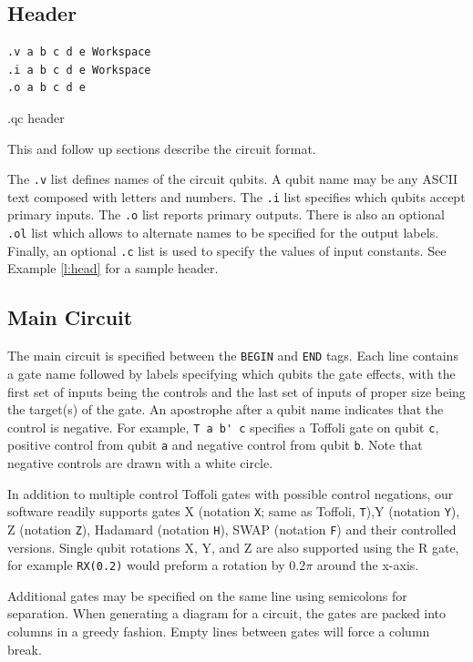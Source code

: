 \documentclass[aps,prl,reprint,floatfix,superscriptaddress]{revtex4-1} %
\begin{document}
\subsection{Header}
\begin{program}
\begin{verbatim}
.v a b c d e Workspace
.i a b c d e Workspace
.o a b c d e
\end{verbatim}
\caption{.qc header}
\label{l:head}
\end{program}
This and follow up sections describe the circuit format. 

The \verb+.v+ list defines names of the circuit qubits. A qubit name may be any ASCII text composed with letters and numbers. The \verb+.i+ list specifies which %
qubits accept primary inputs.
The \verb+.o+ list reports primary outputs.
There is also an optional \verb+.ol+ list which allows to alternate names to be 
specified for the output labels. Finally, an optional \verb+.c+ list is used to
specify the values of input constants. See Example \ref{l:head} for a sample header.

\subsection{Main Circuit}
The main circuit is specified between the \verb+BEGIN+ and \verb+END+ tags.  Each line contains a gate name followed by labels
specifying which qubits the gate effects, with the first set of inputs being the controls
and the last set of inputs of proper size being the target(s) of the gate.
An apostrophe after a qubit name indicates that the control is negative. For example, \verb+T a b' c+ specifies a Toffoli gate on
qubit \verb+c+, positive control from qubit \verb+a+ and negative control from qubit \verb+b+. Note that negative controls are drawn with a white circle.

In addition to multiple control Toffoli gates with possible control negations, our software readily supports gates X 
(notation \verb+X+; same as Toffoli, \verb+T+),Y (notation \verb+Y+), Z (notation \verb+Z+), Hadamard (notation \verb+H+), 
SWAP (notation \verb+F+) and their controlled versions. 
Single qubit rotations X, Y, and Z are also supported using the R gate, for example 
\verb+RX(0.2)+ would preform a rotation by $0.2\pi$ around the x-axis. 

Additional gates may be specified on the same line using semicolons for separation. When generating a diagram for a circuit, 
the gates are packed into columns in a greedy fashion. Empty lines between gates will force a column break.
\end{document}
